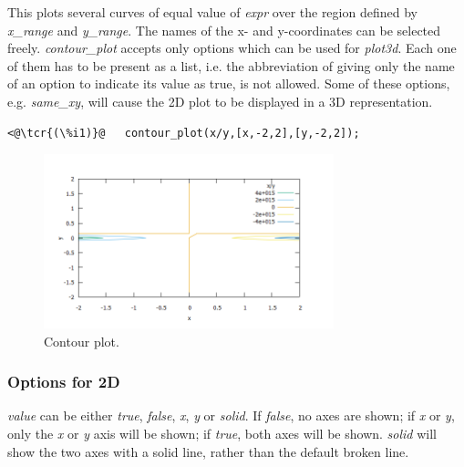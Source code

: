 \documentclass[../Maxima_Workbook.tex]{subfiles}
\begin{document}
\lz This plots several curves of equal value of \emph{expr} over the region defined by \emph{x\_range} and \emph{y\_range}. The names of the x- and y-coordinates can be selected freely. \emph{contour\_plot} accepts only options which can be used for \emph{plot3d}. Each one of them has to be present as a list, i.e. the abbreviation of giving only the name of an option to indicate its value as true, is not allowed. Some of these options, e.g. \emph{same\_xy}, will cause the 2D plot to be displayed in a 3D representation. 

\lz \begin{lstlisting}
<@\tcr{(\%i1)}@   contour_plot(x/y,[x,-2,2],[y,-2,2]);
\end{lstlisting}
\vspace{-2mm} 

\begin{figure}
	\centering
	\includegraphics[width=0.75\textwidth]{Pl_contour_plot.png}
	\caption{Contour plot.}
	\label{Pl-Fig4}
\end{figure}

\subsubsection{Options for 2D}\label{Pl2}

\lz {} \qquad {} \hfill {}

\lz \emph{value} can be either \emph{true}, \emph{false}, \emph{x}, \emph{y} or \emph{solid}. If \emph{false}, no axes are shown; if \emph{x} or \emph{y}, only the \emph{x} or \emph{y} axis will be shown; if \emph{true}, both axes will be shown. \emph{solid} will show the two axes with a solid line, rather than the default broken line.

\lzz {} \hfill {}
\end{document}
